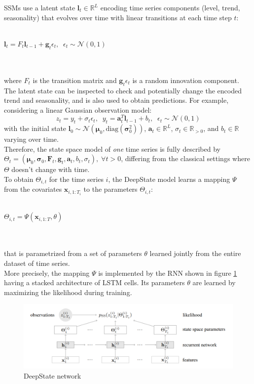 \documentclass[a4paper]{article} %
\begin{document}
	SSMs use a latent state $\pmb{l}_t \in \mathbb{R}^L$ encoding time series components (level, trend, seasonality) that evolves over time with linear transitions at each time step $t$:\\\\
	\centerline{
	$
	\pmb{l}_t = F_t \pmb{l}_{t-1} + \pmb{g }_t \epsilon_t, \;\; \epsilon_t \sim \mathcal{N}(0,1)
	$
	}\\\\
	where $F_t$ is the transition matrix and $\pmb{g }_t \epsilon_t$ is a random innovation component. The latent state can be inspected to check and potentially change the encoded trend and seasonality, and is also used to obtain predictions. For example, considering a linear Gaussian observation model:
	\begin{equation} \label{eq:deepstate}
			z_t = y_t + \sigma_t \epsilon_t, \;\; y_t = \pmb{a}_t^T \pmb{l}_{t-1} + b_t, \;\; \epsilon_t \sim \mathcal{N}(0,1)
	\end{equation}
	with the initial state $\pmb{l}_0 \sim \mathcal{N}(\pmb{\mu}_0, \text{diag}(\pmb{\sigma}_0^2))$, $\pmb{a}_t \in \mathbb{R}^L$, $\sigma_t \in \mathbb{R}_{>0}$, and $b_t \in \mathbb{R}$ varying over time. \\
	Therefore, the state space model of \textit{one} time series is fully described by $\Theta_t = (\pmb{\mu}_0, \pmb{\sigma}_0, \pmb{F}_t, \pmb{g}_ t, \pmb{a}_t, b_t, \sigma_t), \; \forall t > 0$, differing from the classical settings where $\Theta$ doesn't change with time.\\
	To obtain $\Theta_{i,t}$ for the time series $i$, the DeepState model learns a mapping $\Psi$ from the covariates $\pmb{x}_{i, 1:T_i}$ to the parameters $\Theta_{i, t}$:\\\\
	\centerline{
	$
	\Theta_{i,t} = \Psi(\pmb{x}_{i, 1:T}, \theta)
	$
	}\\\\
	that is parametrized from a set of parameters $\theta$ learned jointly from the entire dataset of time series. \\
	More precisely, the mapping $\Psi$ is implemented by the RNN shown in figure \ref{fig:deepstate} having a stacked architecture of LSTM cells. Its parameters $\theta$ are learned by maximizing the likelihood during training.
	\begin{figure}
		\includegraphics[width=\linewidth]{img/deepstate.png}
		\caption{DeepState network}
		\label{fig:deepstate}
	\end{figure}
\end{document}

